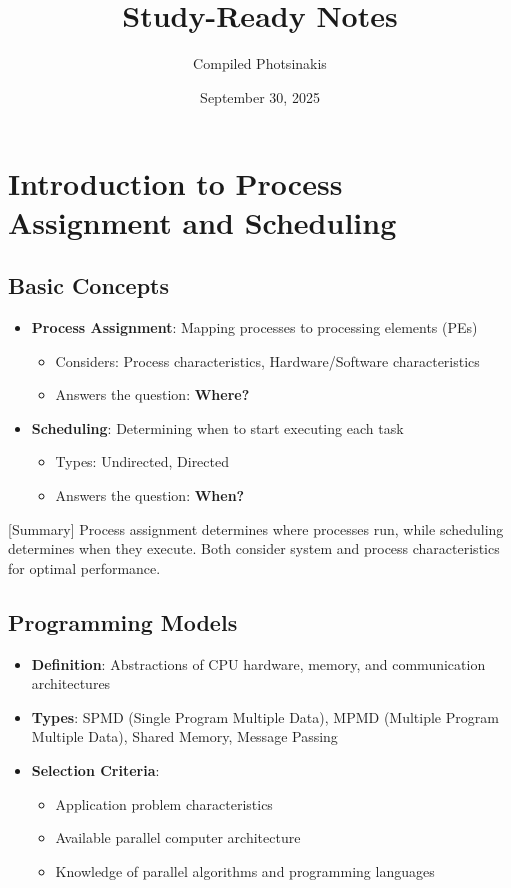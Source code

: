 \documentclass[12pt]{article}
\title{\LECTURETITLE\\\large Study-Ready Notes}
\author{Compiled  Photsinakis}
\date{September 30, 2025}
\begin{document}
\maketitle
\tableofcontents
\newpage

\section{Introduction to Process Assignment and Scheduling}

\subsection{Basic Concepts}
\begin{itemize}
\item \textbf{Process Assignment}: Mapping processes to processing elements (PEs)
  \begin{itemize}
  \item Considers: Process characteristics, Hardware/Software characteristics
  \item Answers the question: \textbf{Where?}
  \end{itemize}
  
\item \textbf{Scheduling}: Determining when to start executing each task
  \begin{itemize}
  \item Types: Undirected, Directed
  \item Answers the question: \textbf{When?}
  \end{itemize}
\end{itemize}

[Summary] Process assignment determines where processes run, while scheduling determines when they execute. Both consider system and process characteristics for optimal performance.

\subsection{Programming Models}
\begin{itemize}
\item \textbf{Definition}: Abstractions of CPU hardware, memory, and communication architectures
\item \textbf{Types}: SPMD (Single Program Multiple Data), MPMD (Multiple Program Multiple Data), Shared Memory, Message Passing
\item \textbf{Selection Criteria}:
  \begin{itemize}
  \item Application problem characteristics
  \item Available parallel computer architecture
  \item Knowledge of parallel algorithms and programming languages
  \end{itemize}
\end{itemize}
\end{document}

